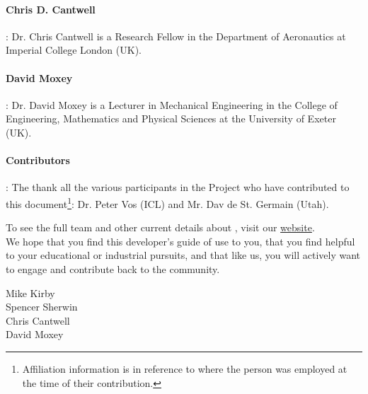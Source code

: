\paragraph{Chris D. Cantwell}: Dr. Chris Cantwell is a Research Fellow in the Department of Aeronautics at Imperial
College London (UK).

\paragraph{David Moxey}: Dr. David Moxey is a Lecturer in Mechanical Engineering in the College of Engineering, Mathematics and Physical Sciences
at the University of Exeter (UK).

\paragraph{Contributors}:  The thank all the various participants in the \nek{} Project who have contributed to this document\footnote{Affiliation information is in reference to where the person was employed at the time of their contribution.}:  Dr. Peter Vos (ICL) and Mr. Dav de St. Germain (Utah).

To see the full team and other current details about \nek{}, visit our \href{http://www.nektar.info}{website}. \\

 We hope that you find this developer's guide of 
use to you, that you find \nek{} helpful to your educational or industrial pursuits, and that like us, you will actively want to engage and contribute
back  to the \nek{} community.

Mike Kirby \\
Spencer Sherwin \\
Chris Cantwell \\
David Moxey \\


  